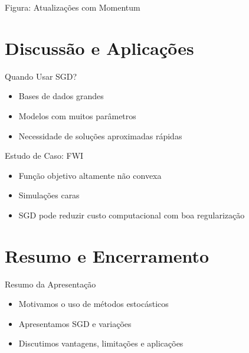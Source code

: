 \documentclass{beamer}
\begin{document}
\begin{frame}{Figura: Atualiza\c{c}\~oes com Momentum}
\begin{center}
\end{center}
\end{frame}

\section{Discuss\~ao e Aplica\c{c}\~oes}

\begin{frame}{Quando Usar SGD?}
\begin{itemize}
    \item Bases de dados grandes
    \item Modelos com muitos par\^ametros
    \item Necessidade de solu\c{c}\~oes aproximadas r\'apidas
\end{itemize}
\end{frame}

\begin{frame}{Estudo de Caso: FWI}
\begin{itemize}
    \item Fun\c{c}\~ao objetivo altamente n\~ao convexa
    \item Simula\c{c}\~oes caras
    \item SGD pode reduzir custo computacional com boa regulariza\c{c}\~ao
\end{itemize}
\end{frame}

\section{Resumo e Encerramento}

\begin{frame}{Resumo da Apresenta\c{c}\~ao}
\begin{itemize}
    \item Motivamos o uso de m\'etodos estoc\'asticos
    \item Apresentamos SGD e varia\c{c}\~oes
    \item Discutimos vantagens, limita\c{c}\~oes e aplica\c{c}\~oes
\end{itemize}
\end{frame}
\end{document}
